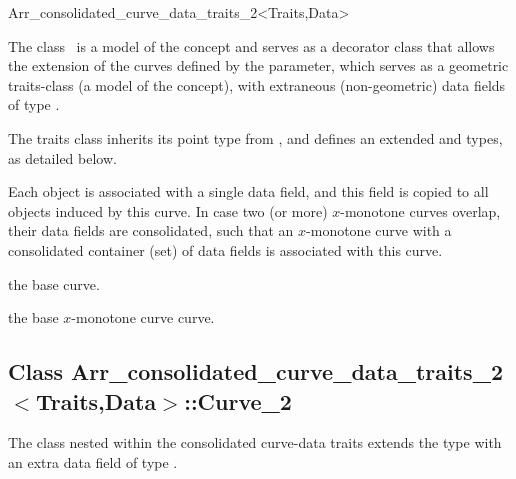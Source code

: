 
\ccRefPageBegin
\begin{ccRefClass}{Arr_consolidated_curve_data_traits_2<Traits,Data>}

\ccDefinition

The class \ccRefName\ is a model of the  concept
and serves as a decorator class that allows the extension of the curves
defined by the  parameter, which serves as a geometric
traits-class (a model of the  concept), with
extraneous (non-geometric) data fields of type .

The traits class inherits its point type from ,
and defines an extended  and  types,
as detailed below.

Each  object is associated with a single data field, and this 
field is copied to all  objects induced by this curve.
In case two (or more) $x$-monotone curves overlap, their data fields are
consolidated, such that an $x$-monotone curve with a consolidated container
(set) of data fields is associated with this curve.

 
\ccIsModel

\ccInheritsFrom

\ccTypes

    {the base curve.}

    {the base $x$-monotone curve curve.}

\subsection*{Class 
 Arr\_consolidated\_curve\_data\_traits\_2$<$Traits,Data$>$::Curve\_2}

The  class nested within the consolidated curve-data traits
extends the  type with an extra data field of type
.


\end{ccRefClass}
